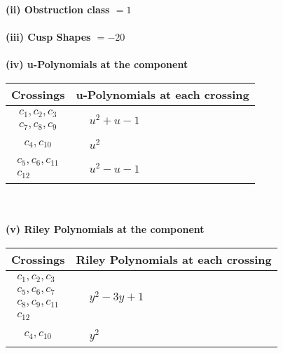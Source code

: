 \documentclass[1p]{elsarticle_modified}
\theoremstyle{definition}
\begin{document}
\flushleft \textbf{(ii) Obstruction class $= 1$}\\~\\
\flushleft \textbf{(iii) Cusp Shapes $= -20$}\\~\\
\newpage\renewcommand{\arraystretch}{1}
\flushleft \textbf{(iv) u-Polynomials at the component}\newline \\
\begin{tabular}{m{50pt}|m{274pt}}
Crossings & \hspace{64pt}u-Polynomials at each crossing \\
\hline $$\begin{aligned}c_{1},c_{2},c_{3}\\c_{7},c_{8},c_{9}\end{aligned}$$&$\begin{aligned}
&u^2+u-1
\end{aligned}$\\
\hline $$\begin{aligned}c_{4},c_{10}\end{aligned}$$&$\begin{aligned}
&u^2
\end{aligned}$\\
\hline $$\begin{aligned}c_{5},c_{6},c_{11}\\c_{12}\end{aligned}$$&$\begin{aligned}
&u^2- u-1
\end{aligned}$\\
\hline
\end{tabular}\\~\\
\newpage\renewcommand{\arraystretch}{1}
\flushleft \textbf{(v) Riley Polynomials at the component}\newline \\
\begin{tabular}{m{50pt}|m{274pt}}
Crossings & \hspace{64pt}Riley Polynomials at each crossing \\
\hline $$\begin{aligned}c_{1},c_{2},c_{3}\\c_{5},c_{6},c_{7}\\c_{8},c_{9},c_{11}\\c_{12}\end{aligned}$$&$\begin{aligned}
&y^2-3 y+1
\end{aligned}$\\
\hline $$\begin{aligned}c_{4},c_{10}\end{aligned}$$&$\begin{aligned}
&y^2
\end{aligned}$\\
\hline
\end{tabular}\\~\\
\end{document}

